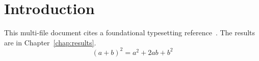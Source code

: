 \chapter{Introduction}\label{chap:introduction}
This multi-file document cites a foundational typesetting reference~\cite{knuth1984}.
The results are in Chapter~\ref{chap:results}.
\begin{equation}\label{eq:identity}
  (a+b)^2 = a^2 + 2ab + b^2
\end{equation}
